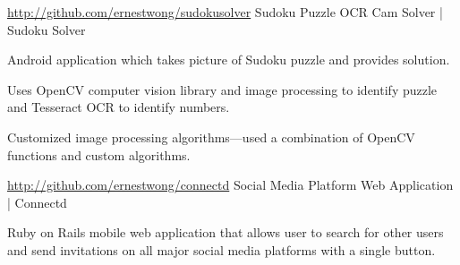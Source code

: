 

\begin{cventries}


  \cventry
    {\href{http://github.com/ernestwong/sudokusolver}{http://github.com/ernestwong/sudokusolver}} %
    {Sudoku Puzzle OCR Cam Solver | Sudoku Solver} %
    {} %
    {} %
    {
      \begin{cvitems} %
      \item {Android application which takes picture of Sudoku puzzle and provides solution.}
      \item {Uses OpenCV computer vision library and image processing to identify puzzle and Tesseract OCR to identify numbers.}
      \item {Customized image processing algorithms—used a combination of OpenCV functions and custom algorithms.}
      \end{cvitems}
    }

  \cventry
    {\href{http://github.com/ernestwong/connectd}{http://github.com/ernestwong/connectd}} %
    { Social Media Platform Web Application | Connectd } %
    {} %
    {} %
    {
      \begin{cvitems} %
      \item {Ruby on Rails mobile web application that allows user to search for other users and send invitations on all major social media platforms with a single button.}
      \end{cvitems}
    }


\end{cventries}
